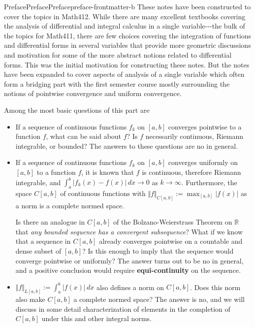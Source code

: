 \documentclass[oneside,10pt,]{book}
\newcommand{\terminology}[1]{\textbf{#1}}
\numberwithin{equation}{section}
\newcommand{\bbR}{\mathbb{R}}
\begin{document}
\begin{preface}{Preface}{Preface}{}{Preface}{}{}{preface-frontmatter-b}
These notes have been constructed to cover the topics in Math412.  While there are many excellent textbooks covering the analysis of differential and integral calculus in a single variable-{}-{}-the bulk of the topics for Math411, there are few  choices covering the integration of functions and differential forms in several variables that provide more geometric discussions and motivation for some of the more abstract notions related to differential forms. This was the initial motivation for constructing these notes. But the notes have been expanded to cover aspects of  analysis of a single variable which often form a bridging part with the first semester course mostly surrounding the  notions of pointwise convergence and uniform convergence.%
\par
Among the most basic questions of this part are%
%
\begin{itemize}[label=\textbullet]
\item{}If a sequence of continuous functions \(f_{k}\) on \([a, b]\) converges pointwise to a function \(f\), what can be said about \(f\)? Is \(f\) necessarily continuous, Riemann integrable, or bounded? The answers to these questions are no in general.%
\item{}If a sequence of continuous functions \(f_{k}\) on \([a, b]\) converges uniformly on \([a, b]\) to a function \(f\), it is  known that \(f\) is continuous, therefore Riemann integrable, and \(\int_{a}^{b}|f_{k}(x)-f(x)|\, dx\to 0\) as \(k\to \infty\). Furthermore,  the space \(C[a, b]\) of continuous functions with \(\Vert f \Vert_{C[a, b]} :=\max_{[a, b]}|f(x)|\) as a norm is a complete normed space.%
\par
Is there an analogue in \(C[a, b]\)  of the Bolzano-Weierstrass Theorem on \(\bbR\) that \emph{any bounded sequence has a convergent subsequence}? What if we know that a sequence in \(C[a,  b]\) already converges pointwise on a countable and dense subset of \([a, b]\)? Is this enough to imply that the sequence would converge pointwise or uniformly? The answer turns out to be no in general, and a positive conclusion would require \terminology{equi-continuity} on the sequence.%
\item{}\(\Vert f \Vert_{L[a, b]} :=\int_{a}^{b} |f(x)|\, dx\) also defines a norm on \(C[a, b]\). Does this norm also make \(C[a, b]\) a complete normed space? The answer is no, and we will discuss in some detail characterization of elements in the completion of \(C[a, b]\) under this and other integral norms.%

\end{itemize}
\end{preface}
\end{document}
